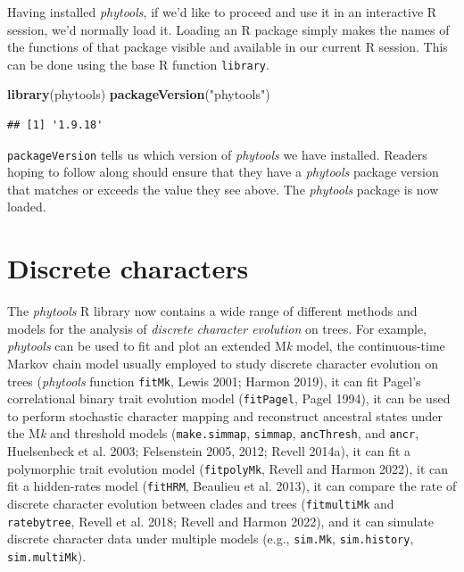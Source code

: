 \documentclass[fleqn,10pt,lineno]{wlpeerj} %
\newenvironment{Shaded}{\begin{snugshade}}{\end{snugshade}}
\newcommand{\FunctionTok}[1]{\textcolor[rgb]{0.13,0.29,0.53}{\textbf{#1}}}
\newcommand{\NormalTok}[1]{#1}
\newcommand{\StringTok}[1]{\textcolor[rgb]{0.31,0.60,0.02}{#1}}
\begin{document}
Having installed \emph{phytools}, if we'd like to proceed and use it in an interactive R session, we'd normally load it. Loading an R package simply makes the names of the functions of that package visible and available in our current R session. This can be done using the base R function \texttt{library}.

\begin{Shaded}
\begin{Highlighting}[]
\FunctionTok{library}\NormalTok{(phytools)}
\FunctionTok{packageVersion}\NormalTok{(}\StringTok{"phytools"}\NormalTok{)}
\end{Highlighting}
\end{Shaded}

\begin{verbatim}
## [1] '1.9.18'
\end{verbatim}

\texttt{packageVersion} tells us which version of \emph{phytools} we have installed. Readers hoping to follow along should ensure that they have a \emph{phytools} package version that matches or exceeds the value they see above. The \emph{phytools} package is now loaded.

\hypertarget{discrete-characters}{%
\section{Discrete characters}\label{discrete-characters}}

The \emph{phytools} R library now contains a wide range of different methods and models for the analysis of \emph{discrete character evolution} on trees. For example, \emph{phytools} can be used to fit and plot an extended M\emph{k} model, the continuous-time Markov chain model usually employed to study discrete character evolution on trees (\emph{phytools} function \texttt{fitMk}, Lewis 2001; Harmon 2019), it can fit Pagel's correlational binary trait evolution model (\texttt{fitPagel}, Pagel 1994), it can be used to perform stochastic character mapping and reconstruct ancestral states under the M\emph{k} and threshold models (\texttt{make.simmap}, \texttt{simmap}, \texttt{ancThresh}, and \texttt{ancr}, Huelsenbeck et al. 2003; Felsenstein 2005, 2012; Revell 2014a), it can fit a polymorphic trait evolution model (\texttt{fitpolyMk}, Revell and Harmon 2022), it can fit a hidden-rates model (\texttt{fitHRM}, Beaulieu et al. 2013), it can compare the rate of discrete character evolution between clades and trees (\texttt{fitmultiMk} and \texttt{ratebytree}, Revell et al. 2018; Revell and Harmon 2022), and it can simulate discrete character data under multiple models (e.g., \texttt{sim.Mk}, \texttt{sim.history}, \texttt{sim.multiMk}).
\end{document}
